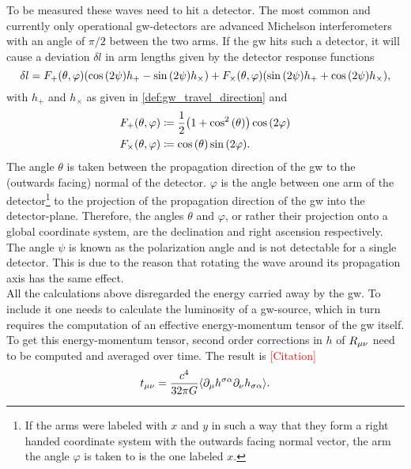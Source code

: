 To be measured these waves need to hit a detector. The most common and currently only operational \gls{gw}-detectors are advanced Michelson interferometers with an angle of $\pi/2$ between the two arms. If the \gls{gw} hits such a detector, it will cause a deviation $\delta l$ in arm lengths given by the detector response functions
\begin{equation}\label{def:detector_response}
\delta l = F_+{\left( \theta, \varphi \right)}{\left( \cos{\left( 2\psi \right)}h_+ - \sin{\left( 2\psi \right)} h_\times \right)} + F_\times{\left( \theta, \varphi \right)}{\left( \sin{\left( 2\psi \right)}h_+ + \cos{\left( 2\psi \right)} h_\times \right)},
\end{equation}
with $h_+$ and $h_\times$ as given in \eqref{def:gw_travel_direction} and
\begin{align}
F_+{\left( \theta, \varphi \right)} &\coloneqq \frac{1}{2}{\left( 1+\cos^2{\left( \theta \right)} \right)}\cos{\left( 2\varphi \right)}\nonumber\\
F_\times{\left( \theta, \varphi \right)} &\coloneqq\cos{\left( \theta \right)}\sin{\left( 2\varphi \right)}.
\end{align}
The angle $\theta$ is taken between the propagation direction of the \gls{gw} to the (outwards facing) normal of the detector. $\varphi$ is the angle between one arm of the detector\footnote{If the arms were labeled with $x$ and $y$ in such a way that they form a right handed coordinate system with the outwards facing normal vector, the arm the angle $\varphi$ is taken to is the one labeled $x$.} to the projection of the propagation direction of the \gls{gw} into the detector-plane. Therefore, the angles $\theta$ and $\varphi$, or rather their projection onto a global coordinate system, are the declination and right ascension respectively. The angle $\psi$ is known as the polarization angle and is not detectable for a single detector. This is due to the reason that rotating the wave around its propagation axis has the same effect.\medskip\\
All the calculations above disregarded the energy carried away by the \gls{gw}. To include it one needs to calculate the luminosity of a \gls{gw}-source, which in turn requires the computation of an effective energy-momentum tensor of the \gls{gw} itself.\\
To get this energy-momentum tensor, second order corrections in $h$ of $R_{\mu\nu}$ need to be computed and averaged over time. The result is \textcolor{red}{[Citation]}
\begin{equation}
t_{\mu\nu} = \frac{c^4}{32\pi G}\langle\partial_\mu h^{\sigma\alpha}\partial_\nu h_{\sigma\alpha}\rangle.
\end{equation}
